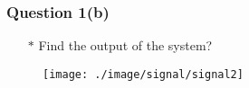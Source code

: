 \documentclass{beamer}
\begin{document}
\begin{frame}
\frametitle{Question 1(b)}

\begin{itemize} \itemsep1pt \parskip0pt 
  \item[$\ast$] Find the output of the system?
\end{itemize}
\vspace{10 mm}


\begin{figure}[H]
  \centering
  \texttt{[image: ./image/signal/signal2]}
\end{figure}
\vspace{10 mm}

\end{frame}

\end{document}
